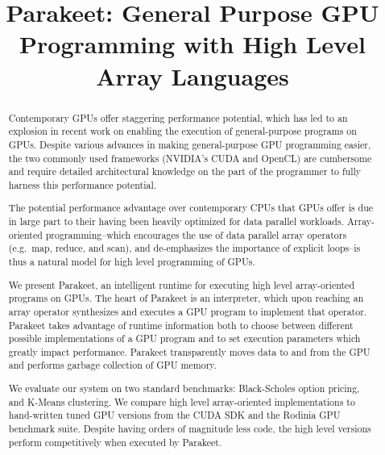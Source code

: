 \documentclass[preprint]{sigplanconf}
\begin{document}


\title{Parakeet: General Purpose GPU Programming with High Level Array
Languages}

\maketitle

\begin{abstract}
Contemporary GPUs offer staggering performance potential, which has
led to an explosion in recent work on enabling the execution of
general-purpose programs on GPUs. Despite various advances in making
general-purpose GPU programming easier, the two commonly used
frameworks (NVIDIA's CUDA and OpenCL) are cumbersome and require
detailed architectural knowledge on the part of the programmer to
fully harness this performance potential.

The potential performance advantage over contemporary CPUs that GPUs
offer is due in large part to their having been heavily optimized for
data parallel workloads.  Array-oriented programming--which encourages
the use of data parallel array operators (e.g.\ map, reduce, and
scan), and de-emphasizes the importance of explicit loops--is thus a
natural model for high level programming of GPUs.

We present Parakeet, an intelligent runtime for executing high level
array-oriented programs on GPUs.  The heart of Parakeet is an
interpreter, which upon reaching an array operator synthesizes and
executes a GPU program to implement that operator. Parakeet takes
advantage of runtime information both to choose between different
possible implementations of a GPU program and to set execution
parameters which greatly impact performance. Parakeet transparently
moves data to and from the GPU and performs garbage collection of GPU
memory.

We evaluate our system on two standard benchmarks: Black-Scholes
option pricing, and K-Means clustering.  We compare high level
array-oriented implementations to hand-written tuned GPU versions from
the CUDA SDK and the Rodinia GPU benchmark suite. Despite having
orders of magnitude less code, the high level
versions perform competitively when executed by Parakeet.
\end{abstract}
\end{document}
